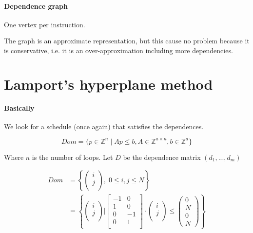 \documentclass{article}
\begin{document}
\paragraph{Dependence graph}
One vertex per instruction.

The graph is an approximate representation, but this cause no problem because it is conservative, i.e. it is an over-approximation including more dependencies.


\section{Lamport's hyperplane method}
\paragraph{Basically}
We look for a schedule (once again) that satisfies the dependences.

\[Dom=\{p\in \mathbb{Z}^n \;|\; Ap\leq b, A\in \mathbb{Z}^{a\times n}, b\in \mathbb{Z}^a\}\]

Where $n$ is the number of loops. Let $D$ be the dependence matrix $(d_1,...,d_m)$

\begin{align*}
Dom & = \left\{ \begin{pmatrix}
i\\j\\
\end{pmatrix}, \; 0\leq i,j\leq N \right\}\\
& = \left\{ \begin{pmatrix}
i\\j\\
\end{pmatrix} \Big| \begin{bmatrix}
-1 & 0\\
1&0\\
0&-1\\
0&1\\
\end{bmatrix} \cdot
\begin{pmatrix}
i\\j\\
\end{pmatrix}\leq \begin{pmatrix}
0\\N\\0\\N
\end{pmatrix} \right\}
\end{align*}
\end{document}
